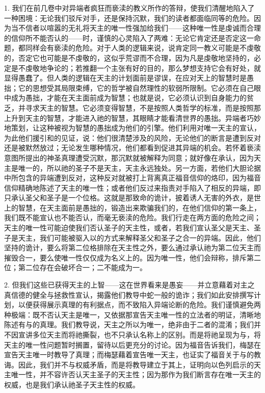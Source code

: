 1. 我们在前几卷中对异端者疯狂而亵渎的教义所作的答辩，使我们清醒地陷入了一种困境：无论我们驳斥对手，还是保持沉默，我们的读者都面临同等的危险。因为当不信者以喧嚣的无礼将天主的唯一性强加给我们——这种唯一性是虔诚而合理的信仰所不能否认的——时，谨慎的心灵陷入了两难：无论它肯定还是否定这一命题，都同样会有亵渎的危险。对于人类的逻辑来说，说肯定同一教义可能是不虔敬的，否定它也可能是不虔敬的，这似乎荒谬而不合理，因为凡是虔敬地坚持的，必定是不虔敬地争论的；若推翻一个主张有好的目的，那么梦想支持它会有好处，就显得愚蠢了。但人类的逻辑在天主的计划面前是谬误，在应对天上的智慧时是愚拙；它的思想受其局限束缚，它的哲学被自然理性的软弱所限制。它必须在自己眼中成为愚拙，才能在天主面前成为智慧；也就是说，它必须认识到自身能力的贫乏，并寻求天主的智慧。它必须变得智慧，不是按照人类哲学的标准，而是按照那上升到天主的智慧，才能进入祂的智慧，其眼睛才能看清世界的愚拙。异端者巧妙地策划，让这种被视为智慧的愚拙成为他们的引擎。他们利用对唯一天主的宣认，为此他们援引和的见证，说：他们很清楚涉及的风险，无论他们的断言是遭到反对还是被默然放过；无论发生哪种情况，他们都看到促进其异端的机会。若怀着亵渎意图所提出的神圣真理遭受沉默，那沉默就被解释为同意；就好像在承认，因为天主是唯一的，所以祂的圣子不是天主，天主永远独处。另一方面，若他们大胆论据中所包含的异端遭到反对，这种反对就被打上背离真正福音信仰的烙印，因为福音信仰精确地陈述了天主的唯一性；或者他们反过来指责对手陷入了相反的异端，即只承认圣父和圣子是一个位格。这就是那致命的诡计，披着诱人无害的外衣，是世上的智慧，在天主面前是愚拙的，锻造出来欺骗我们的，在他们信仰的第一条上，我们既不能宣认也不能否认，而毫无亵渎的危险。我们行走在两方面的危险之间；天主的唯一性可能迫使我们否认圣子的天主性，或者，若我们宣认圣父是天主、圣子是天主，我们可能被驱入以的方式来解释圣父和圣子之合一的异端。因此，他们坚持的诡计，要么将第二位格排除在天主性之外，要么通过承认祂为第二位天主而摧毁合一，要么使唯一性仅仅成为名义上的。因为唯一性，他们会辩称，排斥第二位；第二位存在会破坏合一；二不能成为一。\par

2. 但我们这些已获得天主的上智——这在世界看来是愚妄——并立意藉着对主之真信德的健全与拯救性宣认，揭露他们教导中蛇一般的诡诈；我们如此安排撰写计划，以便获得展示真理的有利据点，而不致陷入异端论断的危险。我们谨慎避免两种极端：既不否认天主是唯一，又依据那宣告天主唯一性的立法者的明证，清晰地陈述有与的真理。我们教导说，天主之所以为唯一，绝非由于二者的混淆；我们并不因宣讲多位天主而将祂撕裂，也不只承认名称上的区别。而是将祂呈现为与，将天主的唯一性问题暂时搁置，留待以后更充分的讨论。因为福音告诉我们，梅瑟在宣告天主唯一时教导了真理；而梅瑟藉着宣告唯一天主，也证实了福音关于与的教诲。因此，我们并不与权威矛盾，而是将教导建立于其上，证明向以色列启示的天主唯一性，并不容许否认天主圣子的天主性；因为那作为我们断言存在唯一天主的权威，也是我们承认祂圣子天主性的权威。\par

